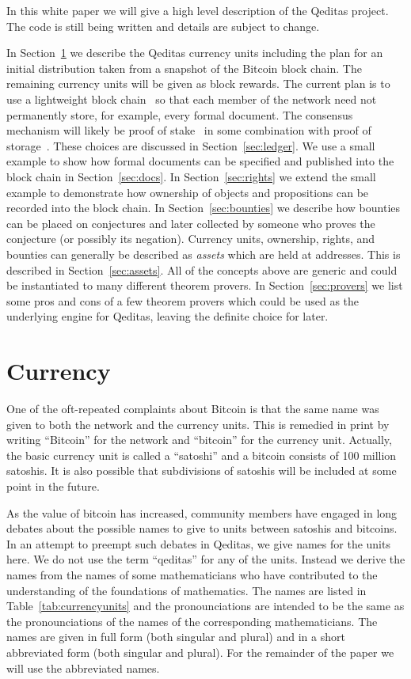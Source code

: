 \documentclass{article}
\begin{document}
In this white paper we will give a high level description of the Qeditas project.
The code is still being written and details are subject to change.

In Section~\ref{sec:currency} we describe the Qeditas currency units
including the plan for an initial distribution taken from a snapshot of
the Bitcoin block chain. The remaining currency units will be given as block
rewards.
The current plan is to use
a lightweight block chain~\cite{Bruce2014,White2015b} so that
each member of the network need not permanently store, for example, every formal document.
The consensus mechanism will likely be proof of stake~\cite{ProofOfStakeDefinite} in some combination with proof of
storage~\cite{MillerJSPK14}.
These choices are discussed in Section~\ref{sec:ledger}.
We use a small
example to show how formal documents can be specified and published into the
block chain
in Section~\ref{sec:docs}.
In Section~\ref{sec:rights} we extend the small example to demonstrate how ownership of objects and propositions can be recorded into the block
chain.
In Section~\ref{sec:bounties} we describe how bounties can be placed on
conjectures and later collected by someone who proves the conjecture (or possibly its negation).
Currency units, ownership, rights, and bounties can generally be described as {\em{assets}}
which are held at addresses. This is described in Section~\ref{sec:assets}.
All of the concepts above are generic and could be instantiated to many
different theorem provers. In Section~\ref{sec:provers}
we list some pros and cons of a few theorem provers which could be used as the underlying engine
for Qeditas, leaving the definite choice for later.

\section{Currency}\label{sec:currency}

One of the oft-repeated complaints about Bitcoin is
that the same name was given to both the network and the currency units.
This is remedied in print by writing ``Bitcoin'' for the network
and ``bitcoin'' for the currency unit. Actually, the basic currency unit
is called a ``satoshi'' and a bitcoin consists of 100 million satoshis.
It is also possible that subdivisions of satoshis will be included at some
point in the future.

As the value of bitcoin has increased, community members have engaged in long debates about
the possible names to give to units between satoshis and bitcoins.
In an attempt to preempt such debates in Qeditas, we give names for the units
here. We do not use the term ``qeditas'' for any of the units.
Instead we derive the names from the names of some mathematicians who have contributed
to the understanding of the foundations of mathematics.
The names are listed in Table~\ref{tab:currencyunits}
and the pronounciations are intended to be the same as the
pronounciations of the names of the corresponding mathematicians.
The names are given in full form (both singular and plural)
and in a short abbreviated form (both singular and plural).
For the remainder of the paper we will use the abbreviated names.
\end{document}
